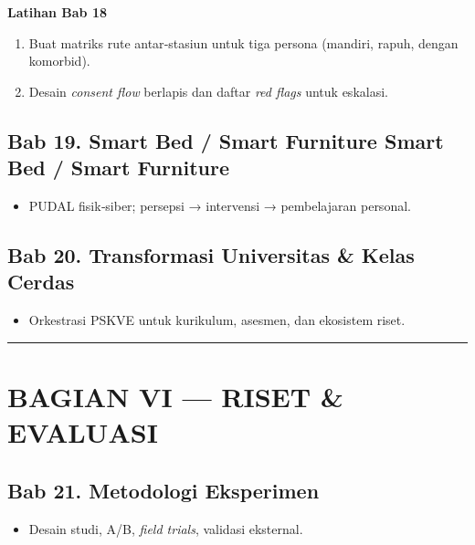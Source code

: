 \documentclass[
  letterpaper,
  DIV=11,
  numbers=noendperiod]{scrartcl}
\providecommand{\tightlist}{%
  \setlength{\itemsep}{0pt}\setlength{\parskip}{0pt}}
\begin{document}
\textbf{Latihan Bab 18}

\begin{enumerate}
\def\labelenumi{\arabic{enumi}.}
\tightlist
\item
  Buat matriks rute antar‑stasiun untuk tiga persona (mandiri, rapuh,
  dengan komorbid).
\item
  Desain \emph{consent flow} berlapis dan daftar \emph{red flags} untuk
  eskalasi.
\end{enumerate}

\subsection{Bab 19. Smart Bed / Smart Furniture Smart Bed / Smart
Furniture}\label{bab-19.-smart-bed-smart-furniture-smart-bed-smart-furniture}

\begin{itemize}
\tightlist
\item
  PUDAL fisik‑siber; persepsi → intervensi → pembelajaran personal.
\end{itemize}

\subsection{Bab 20. Transformasi Universitas \& Kelas
Cerdas}\label{bab-20.-transformasi-universitas-kelas-cerdas}

\begin{itemize}
\tightlist
\item
  Orkestrasi PSKVE untuk kurikulum, asesmen, dan ekosistem riset.
\end{itemize}

\begin{center}\rule{0.5\linewidth}{0.5pt}\end{center}

\section{BAGIAN VI --- RISET \&
EVALUASI}\label{bagian-vi-riset-evaluasi}

\subsection{Bab 21. Metodologi
Eksperimen}\label{bab-21.-metodologi-eksperimen}

\begin{itemize}
\tightlist
\item
  Desain studi, A/B, \emph{field trials}, validasi eksternal.
\end{itemize}
\end{document}
